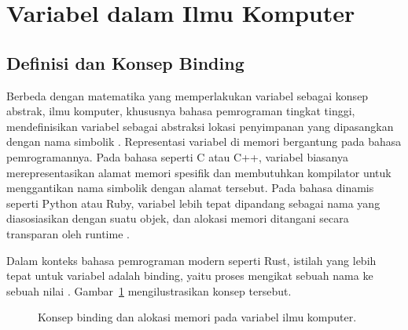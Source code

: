 \documentclass[11pt,a4paper]{article}
\begin{document}
\section{Variabel dalam Ilmu Komputer}

\subsection{Definisi dan Konsep Binding}

Berbeda dengan matematika yang memperlakukan variabel sebagai konsep abstrak, ilmu komputer, khususnya bahasa pemrograman tingkat tinggi, mendefinisikan variabel sebagai abstraksi lokasi penyimpanan yang dipasangkan dengan nama simbolik \cite{brookshear,wikipedia_cs}. Representasi variabel di memori bergantung pada bahasa pemrogramannya. Pada bahasa seperti C atau C++, variabel biasanya merepresentasikan alamat memori spesifik dan membutuhkan kompilator untuk menggantikan nama simbolik dengan alamat tersebut. Pada bahasa dinamis seperti Python atau Ruby, variabel lebih tepat dipandang sebagai nama yang diasosiasikan dengan suatu objek, dan alokasi memori ditangani secara transparan oleh runtime \cite{wikipedia_cs}.

Dalam konteks bahasa pemrograman modern seperti Rust, istilah yang lebih tepat untuk variabel adalah binding, yaitu proses mengikat sebuah nama ke sebuah nilai \cite{klabnik}. Gambar~\ref{fig:komputer_memori} mengilustrasikan konsep tersebut.

\begin{figure}[H]
	\centering
	\caption{Konsep binding dan alokasi memori pada variabel ilmu komputer.}
	\label{fig:komputer_memori}
\end{figure}
\end{document}
